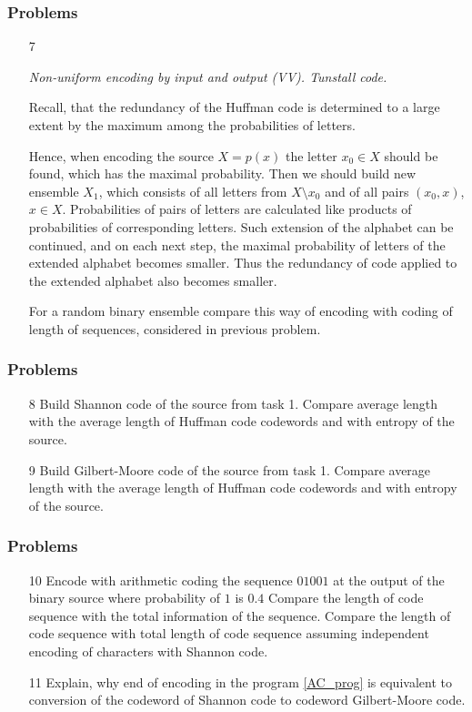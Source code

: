 \documentclass[14pt]{beamer}
\begin{document}
\begin{frame}
\frametitle{Problems}
\begin{enumerate}
  \item[7] 
  \footnotesize { \emph{Non-uniform encoding by input and output (VV). Tunstall code.}
  
  Recall, that the redundancy of the Huffman code is determined to a large extent by the maximum among the probabilities of letters. 
  
  Hence, when encoding the source $X={p(x)}$ the letter $x_0\in X$ should be found, which has the maximal probability. Then we should build new ensemble $X_1$, which consists of all letters from $X\setminus{x_0}$ and of all pairs $(x_0,x)$, $x\in X$. Probabilities of pairs of letters are calculated like products of probabilities of corresponding letters. 
  Such extension of the alphabet can be continued, and on each next step, the maximal probability of letters of the extended alphabet becomes smaller. Thus the redundancy of code applied to the extended alphabet also becomes smaller.

  For a random binary ensemble compare this way of encoding with coding of length of sequences, considered in previous problem.
 
}
\end{enumerate}
\end{frame}


\begin{frame}
\frametitle{Problems}
\begin{enumerate}
\item[8] Build Shannon code of the source from task 1. Compare average length with the average length of Huffman code codewords and with entropy of the source.

\pause \item[9] Build Gilbert-Moore code of the source from task 1. Compare average length with the average length of Huffman code codewords and with entropy of the source.

\end{enumerate}
\end{frame}


\begin{frame}
\frametitle{Problems}
\begin{enumerate}

 \item[10] Encode with arithmetic coding the sequence $01001$ at the output of the binary source where probability of $1$ is $0.4$
 Compare the length of code sequence with the total information of the sequence. 
 Compare the length of code sequence with total length of code sequence assuming independent encoding of characters with Shannon code.
 
\pause \item[11] Explain, why end of encoding in the program \ref{AC_prog} is equivalent to conversion of the codeword of Shannon code to codeword Gilbert-Moore code.

\end{enumerate}
\end{frame}
\end{document}
